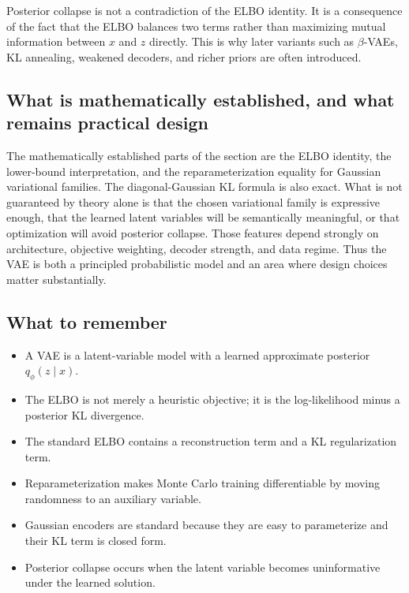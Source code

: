 \medskip

\noindent
Posterior collapse is not a contradiction of the ELBO identity.
It is a consequence of the fact that the ELBO balances two terms rather than maximizing mutual information between $x$ and $z$ directly.
This is why later variants such as $\beta$-VAEs, KL annealing, weakened decoders, and richer priors are often introduced.

\subsection*{What is mathematically established, and what remains practical design}

The mathematically established parts of the section are the ELBO identity, the lower-bound interpretation, and the reparameterization equality for Gaussian variational families.
The diagonal-Gaussian KL formula is also exact.
What is not guaranteed by theory alone is that the chosen variational family is expressive enough, that the learned latent variables will be semantically meaningful, or that optimization will avoid posterior collapse.
Those features depend strongly on architecture, objective weighting, decoder strength, and data regime.
Thus the VAE is both a principled probabilistic model and an area where design choices matter substantially.

\subsection*{What to remember}

\begin{itemize}
    \item A VAE is a latent-variable model with a learned approximate posterior $q_\phi(z\mid x)$.
    \item The ELBO is not merely a heuristic objective; it is the log-likelihood minus a posterior KL divergence.
    \item The standard ELBO contains a reconstruction term and a KL regularization term.
    \item Reparameterization makes Monte Carlo training differentiable by moving randomness to an auxiliary variable.
    \item Gaussian encoders are standard because they are easy to parameterize and their KL term is closed form.
    \item Posterior collapse occurs when the latent variable becomes uninformative under the learned solution.
\end{itemize}

